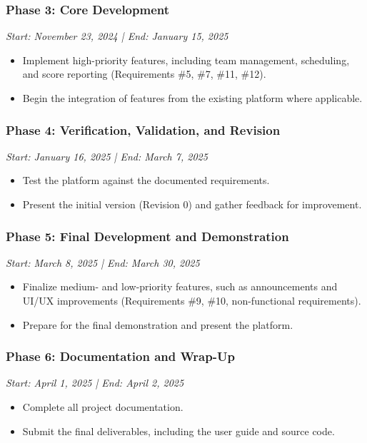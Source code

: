 \documentclass[12pt]{article}
\begin{document}
\subsubsection{Phase 3: Core Development}
\textit{Start: November 23, 2024 | End: January 15, 2025}
\begin{itemize}
    \item Implement high-priority features, including team management, scheduling, and score reporting (Requirements \#5, \#7, \#11, \#12).
    \item Begin the integration of features from the existing platform where applicable.
\end{itemize}

\subsubsection{Phase 4: Verification, Validation, and Revision}
\textit{Start: January 16, 2025 | End: March 7, 2025}
\begin{itemize}
    \item Test the platform against the documented requirements.
    \item Present the initial version (Revision 0) and gather feedback for improvement.
\end{itemize}

\subsubsection{Phase 5: Final Development and Demonstration}
\textit{Start: March 8, 2025 | End: March 30, 2025}
\begin{itemize}
    \item Finalize medium- and low-priority features, such as announcements and UI/UX improvements (Requirements \#9, \#10, non-functional requirements).
    \item Prepare for the final demonstration and present the platform.
\end{itemize}

\subsubsection{Phase 6: Documentation and Wrap-Up}
\textit{Start: April 1, 2025 | End: April 2, 2025}
\begin{itemize}
    \item Complete all project documentation.
    \item Submit the final deliverables, including the user guide and source code.
\end{itemize}
\end{document}
